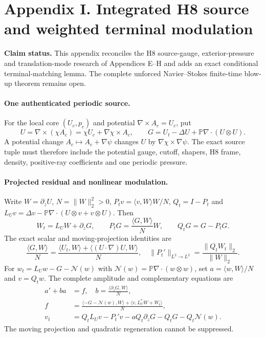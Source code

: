 \clearpage
\section*{Appendix I. Integrated H8 source and weighted terminal modulation}
\noindent\textbf{Claim status.} This appendix reconciles the H8 source-gauge, exterior-pressure and translation-mode research of Appendices E--H and adds an exact conditional terminal-matching lemma. The complete unforced Navier--Stokes finite-time blow-up theorem remains open.

\paragraph{One authenticated periodic source.}
For the local core $(U_c,p_c)$ and potential $\nabla\times A_c=U_c$, put
\[
U=\nabla\times(\chi A_c)=\chi U_c+\nabla\chi\times A_c,\qquad
G=U_t-\Delta U+\mathbb P\nabla\cdot(U\otimes U).
\]
A potential change $A_c\mapsto A_c+\nabla\psi$ changes $U$ by $\nabla\chi\times\nabla\psi$. The exact source tuple must therefore include the potential gauge, cutoff, shapers, H8 frame, density, positive-ray coefficients and one periodic pressure.

\paragraph{Projected residual and nonlinear modulation.}
Write $W=\partial_zU$, $N=\|W\|_2^2>0$,
$P_tv=\langle v,W\rangle W/N$, $Q_t=I-P_t$ and
$L_Uv=\Delta v-\mathbb P\nabla\cdot(U\otimes v+v\otimes U)$.
Then
\[
W_t=L_UW+\partial_zG,\qquad
P_tG=\frac{\langle G,W\rangle}{N}W,\qquad
Q_tG=G-P_tG.
\]
The exact scalar and moving-projection identities are
\[
\frac{\langle G,W\rangle}{N}
=\frac{\langle U_t,W\rangle+\langle(U\cdot\nabla)U,W\rangle}{N},
\quad
\|P_t'\|_{L^2\to L^2}=\frac{\|Q_tW_t\|_2}{\|W\|_2}.
\]
For $w_t=L_Uw-G-\mathcal N(w)$ with
$\mathcal N(w)=\mathbb P\nabla\cdot(w\otimes w)$, set
$a=\langle w,W\rangle/N$ and $v=Q_tw$.
The complete amplitude and complementary equations are
\begin{align*}
 a'+ba&=f,\quad b=\frac{\langle\partial_zG,W\rangle}{N},\\
 f&=\frac{\langle-G-\mathcal N(w),W\rangle+
 \langle v,L_U^*W+W_t\rangle}{N},\\
 v_t&=Q_tL_Uv-P_t'v-aQ_t\partial_zG-Q_tG-Q_t\mathcal N(w).
\end{align*}
The moving projection and quadratic regeneration cannot be suppressed.

